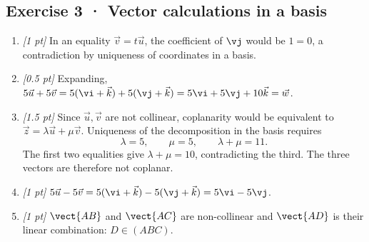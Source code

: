 \subsection*{Exercise 3 · Vector calculations in a basis}\begin{enumerate}

\item \textit{[1 pt]} In an equality $\vec v=t\vec u$, the coefficient of $\vj $ would be $1=0$, a contradiction by uniqueness of coordinates in a basis.

\item \textit{[0.5 pt]} Expanding, $5\vec u+5\vec v=5(\vi +\vec k)+5(\vj +\vec k)=5\vi +5\vj +10\vec k=\vec w$.

\item \textit{[1.5 pt]} Since $\vec u,\vec v$ are not collinear, coplanarity would be equivalent to $\vec z=\lambda\vec u+\mu\vec v$. Uniqueness of the decomposition in the basis requires
\[\lambda=5,\qquad\mu=5,\qquad\lambda+\mu=11.\]
The first two equalities give $\lambda+\mu=10$, contradicting the third. The three vectors are therefore not coplanar.

\item \textit{[1 pt]} $5\vec u-5\vec v=5(\vi +\vec k)-5(\vj +\vec k)=5\vi -5\vj $.

\item \textit{[1 pt]} $\vect{AB}$ and $\vect{AC}$ are non-collinear and $\vect{AD}$ is their linear combination: $D\in(ABC)$.

\end{enumerate}


